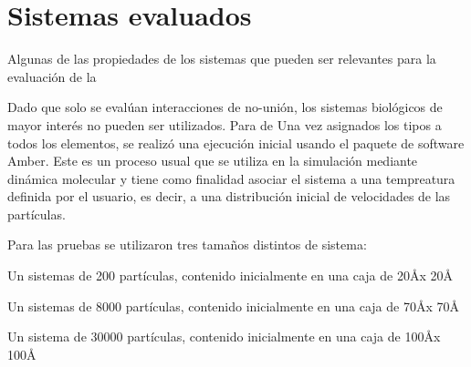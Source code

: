 \chapter{Sistemas evaluados}

Algunas de las propiedades de los sistemas que pueden ser relevantes para la evaluación de la 

Dado que solo se evalúan interacciones de no-unión, los sistemas biológicos de mayor interés no pueden ser utilizados.
Para de
Una vez asignados los tipos a todos los elementos, se realizó una ejecución inicial usando el paquete de software Amber. 
Este es un proceso usual que se utiliza en la simulación mediante dinámica molecular y tiene como finalidad asociar el sistema a una tempreatura definida por el usuario, 
es decir, a una distribución inicial de velocidades de las partículas.

Para las pruebas se utilizaron tres tamaños distintos de sistema:

Un sistemas de 200 partículas, contenido inicialmente en una caja de 20\AA x 20\AA

Un sistemas de 8000 partículas, contenido inicialmente en una caja de 70\AA x 70\AA

Un sistema de 30000 partículas, contenido inicialmente en una caja de 100\AA x 100\AA
